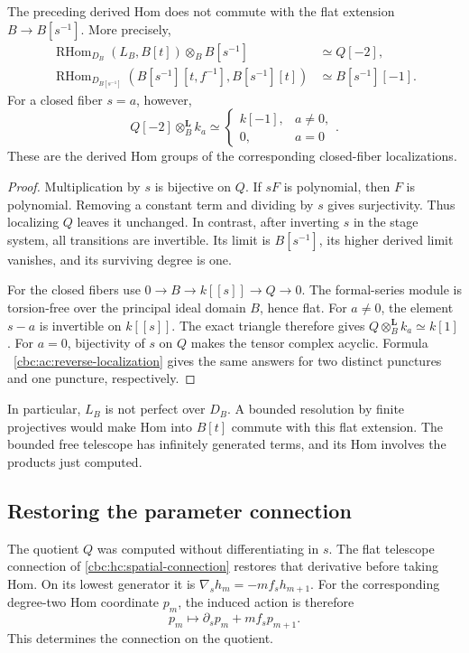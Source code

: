 \begin{proposition}\label{cbc:ac:base-change}
The preceding derived Hom does not commute with the
flat extension $B\to B[s^{-1}]$. More precisely,
\begin{align*}
 \operatorname{RHom}_{D_B}(L_B,B[t])
                   \otimes_B B[s^{-1}]&\simeq Q[-2],\\
 \operatorname{RHom}_{D_{B[s^{-1}]}}
       (B[s^{-1}][t,f^{-1}],B[s^{-1}][t])
                              &\simeq B[s^{-1}][-1].
\end{align*}
For a closed fiber $s=a$, however,
\[
 Q[-2]\otimes_B^{\mathbf L}k_a
       \simeq
       \begin{cases}k[-1],&a\ne0,\\0,&a=0\end{cases}.
\]
These are the derived Hom groups of the corresponding
closed-fiber localizations.
\end{proposition}
\begin{proof}
Multiplication by $s$ is bijective on $Q$.
If $sF$ is polynomial, then $F$ is polynomial.
Removing a constant term and dividing by $s$ gives
surjectivity. Thus localizing $Q$ leaves it unchanged.
In contrast, after inverting $s$ in the stage system,
all transitions are invertible. Its limit is
$B[s^{-1}]$, its higher derived limit vanishes,
and its surviving degree is one.

For the closed fibers use
$0\to B\to k[[s]]\to Q\to0$.
The formal-series module is torsion-free over the
principal ideal domain $B$, hence flat.
For $a\ne0$, the element $s-a$ is invertible on
$k[[s]]$. The exact triangle therefore gives
$Q\otimes_B^{\mathbf L}k_a\simeq k[1]$.
For $a=0$, bijectivity of $s$ on $Q$ makes the
tensor complex acyclic. Formula
~\eqref{cbc:ac:reverse-localization} gives the
same answers for two distinct punctures and one
puncture, respectively.
\end{proof}

In particular, $L_B$ is not perfect over $D_B$.
A bounded resolution by finite projectives would
make Hom into $B[t]$ commute with this flat extension.
The bounded free telescope has infinitely generated
terms, and its Hom involves the products just computed.

\subsection{Restoring the parameter connection}

The quotient $Q$ was computed without differentiating
in $s$. The flat telescope connection of
\eqref{cbc:hc:spatial-connection} restores that
derivative before taking Hom. On its lowest
generator it is
$\nabla_s h_m=-m f_s h_{m+1}$.
For the corresponding degree-two Hom coordinate
$p_m$, the induced action is therefore
\[
 p_m\longmapsto \partial_s p_m+m f_s p_{m+1}.
\]
This determines the connection on the quotient.

